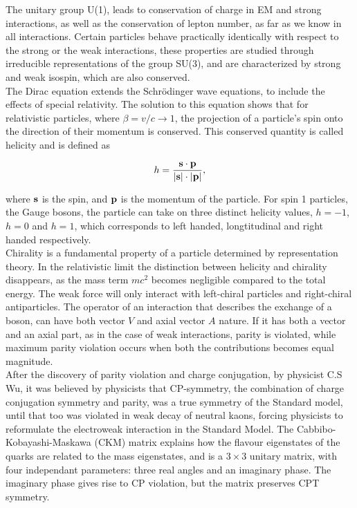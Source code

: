 \documentclass[12pt,a4paper]{article}
\begin{document}
The unitary group U(1), leads to conservation of charge in EM and strong
interactions, as well as the conservation of lepton number, as far as
we know in all interactions. Certain particles behave practically identically
with respect to the strong or the weak interactions, these properties are
studied through irreducible representations of the group SU(3), and are
characterized by strong and weak isospin, which are also conserved.\\

The Dirac equation extends the Schrödinger wave equations, to include the
effects of special relativity. The solution to this equation shows that for
relativistic particles, where $\beta = v/c \rightarrow 1$, the projection of a particle's spin
onto the direction of their momentum is conserved. This conserved quantity is
called helicity\cite[63]{Povh2015} and is defined as

\begin{equation}
  h = \frac{\vb{s \cdot p}}{\abs{\vb s} \cdot \abs{\vb p}},
\end{equation}

where $\vb s$ is the  spin, and $\vb p$ is the momentum of the particle. For
spin 1 particles, the Gauge bosons, the particle can take on three distinct
helicity values, $h=-1$, $h=0$ and $h=1$, which corresponds to left handed,
longtitudinal and right handed respectively.\\

Chirality is a fundamental property of a particle determined by representation
theory. In the relativistic limit the distinction between helicity and chirality
disappears, as the mass term $mc^2$ becomes negligible compared to the total
energy. The weak force will only interact with left-chiral particles and
right-chiral antiparticles. The operator of an interaction that describes the
exchange of a boson, can have both vector $V$ and axial vector $A$ nature. If it
has both a vector and an axial part, as in the case of weak interactions, parity
is violated, while maximum parity violation occurs when both the contributions
becomes equal magnitude.\\

After the discovery of parity violation and charge conjugation, by physicist C.S
Wu\cite{PhysRev.105.1413}, it was believed by physicists that CP-symmetry, the
combination of charge conjugation symmetry and parity, was a true symmetry of
the Standard model, until that too was violated in weak decay of neutral kaons,
forcing physicists to reformulate the electroweak interaction in the Standard
Model. The Cabbibo-Kobayashi-Maskawa (CKM) matrix explains how the flavour
eigenstates of the quarks are related to the mass eigenstates, and is a $3 \times 3$
unitary matrix, with four independant parameters: three real angles and an
imaginary phase\cite[153]{Povh2015}. The imaginary phase gives rise to CP
violation, but the matrix preserves CPT symmetry.
\end{document}
